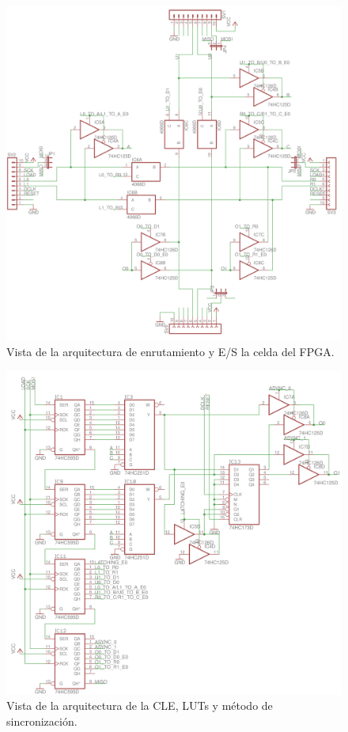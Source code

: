 \documentclass[12pt]{article}
\begin{document}
\begin{figure}[H]
  \centering
  \includegraphics[width=\textwidth]{5-input-output-routing.png}
  \caption{Vista de la arquitectura de enrutamiento y E/S la celda del FPGA.}
  \label{fig:5}
\end{figure}

\begin{figure}[H]
  \centering
  \includegraphics[width=\textwidth]{6-clb-lut.png}
  \caption{Vista de la arquitectura de la CLE, LUTs y método de sincronización.}
  \label{fig:5}
\end{figure}
\end{document}
